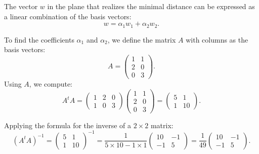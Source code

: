 \documentclass{report}
\begin{document}
The vector \( w \) in the plane that realizes the minimal distance can be expressed as a linear combination of the basis vectors:
\[
w = \alpha_1 w_1 + \alpha_2 w_2.
\]


To find the coefficients \( \alpha_1 \) and \( \alpha_2 \), we define the matrix \( A \) with columns as the basis vectors:
\[
A = \begin{pmatrix} 1 & 1 \\ 2 & 0 \\ 0 & 3 \end{pmatrix}.
\]
Using \( A \), we compute:
\[
A^tA = \begin{pmatrix} 1 & 2 & 0 \\ 1 & 0 & 3 \end{pmatrix} \begin{pmatrix} 1 & 1 \\ 2 & 0 \\ 0 & 3 \end{pmatrix} = \begin{pmatrix} 5 & 1 \\ 1 & 10 \end{pmatrix}.
\]


Applying the formula for the inverse of a \( 2 \times 2 \) matrix:
\[
(A^tA)^{-1} = \begin{pmatrix} 5 & 1 \\ 1 & 10 \end{pmatrix}^{-1} = \frac{1}{5 \times 10 - 1 \times 1} \begin{pmatrix} 10 & -1 \\ -1 & 5 \end{pmatrix} = \frac{1}{49} \begin{pmatrix} 10 & -1 \\ -1 & 5 \end{pmatrix}.
\]
\end{document}
